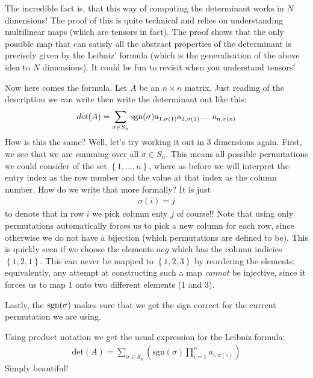The incredible fact is, that this way of computing the determinant works in \(N\) dimensions! The proof of this is quite technical and relies on understanding multilinear maps (which are tensors in fact). The proof shows that the only possible map that can satisfy all the abstract properties of the determinant is precisely given by the Leibniz' formula (which is the generalisation of the above idea to \(N\) dimensions). It could be fun to revisit when you understand tensors!

Now here comes the formula. Let \(A\) be an \(n \times n\) matrix. Just reading of the description we can write then write the determinant out like this: \begin{align*}
    det(A) = \sum_{\sigma \in S_n} \rm{sgn}(\sigma)a_{1, \sigma (1)}a_{2, \sigma (2)}\dots a_{n, \sigma (n)} 
\end{align*}
How is this the same? Well, let's try working it out in 3 dimensions again. First, we see that we are summing over all \(\sigma \in S_n\). This means all possible permutations we could consider of the set \(\left\{ 1, \dots, n\right\}\), where as before we will interpret the entry index as the row number and the value at that index as the column number. How do we write that more formally? It is just \begin{align*}
    \sigma (i) = j
\end{align*}
to denote that in row \(i\) we pick column enty \(j\) of course!! Note that using only permutations automatically forces us to pick a new column for each row, since otherwise we do not have a bijection (which permutations are defined to be). This is quickly seen if we choose the elements \(aeg\) which has the column indicies \(\left\{ 1, 2, 1 \right\} \). This can never be mapped to \(\left\{ 1, 2, 3\right\}\) by reordering the elements; equivalently, any attempt at constructing such a map \textit{cannot} be injective, since it forces us to map \(1\) onto two different elements (1 and 3).

Lastly, the \(\rm{sgn}(\sigma)\) makes sure that we get the sign correct for the current permutation we are using.

Using product notation we get the usual expression for the Leibniz formula:
\begin{align*}
    \boxed{\text{det}(A) = \sum_{\sigma \in S_n}\left(\text{sgn}(\sigma) \prod_{i=1} ^n a_{i, \sigma (i)}\right)}
\end{align*}
Simply beautiful!


